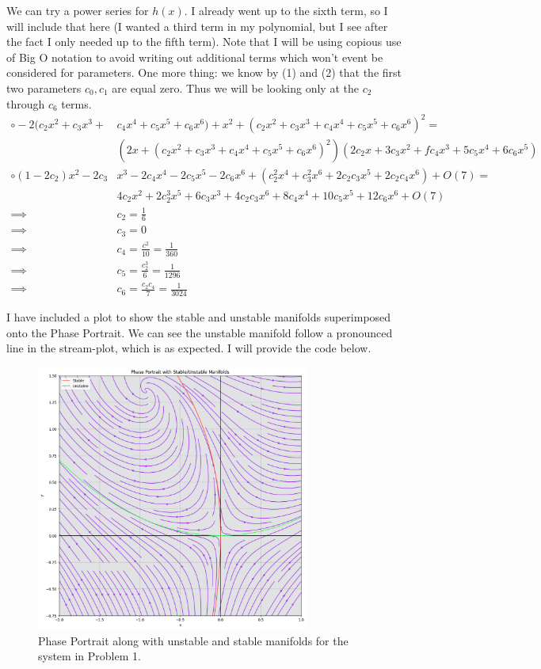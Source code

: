 \begin{solution}
    We can try a power series for $h(x)$. I already went up to the sixth term, so I will include that here (I wanted a third term in my polynomial, but I see after the fact I only needed up to the fifth term). Note that I will be using copious use of Big O notation to avoid writing out additional terms which won't event be considered for parameters. One more thing: we know by (1) and (2) that the first two parameters $c_0, c_1$ are equal zero. Thus we will be looking only at the $c_2$ through $c_6$ terms.
    \alignbreak
    \begin{align*}
        \circ-2(c_2x^2 + c_3x^3 + &c_4x^4 + c_5x^5 + c_6x^6) + x^2 + (c_2x^2 + c_3x^3 + c_4x^4 + c_5x^5 + c_6x^6)^2 =\\
        &(2x + (c_2x^2 + c_3x^3 + c_4x^4 + c_5x^5 + c_6x^6)^2)(2c_2x + 3c_3x^2 + fc_4x^3 + 5c_5x^4 + 6c_6x^5)\\
        \circ (1-2c_2)x^2 - 2c_3&x^3 - 2c_4x^4 - 2c_5x^5 - 2c_6x^6 + (c_2^2x^4 + c_3^2x^6 + 2c_2c_3x^5 + 2c_2c_4x^6) + O(7) =\\
        &4c_2x^2 + 2c_2^3x^5 + 6c_3x^3 + 4c_2c_3x^6 + 8c_4x^4 + 10c_5x^5 + 12c_6x^6 + O(7)\\
        \implies &c_2 = \frac{1}{6}\\
        \implies &c_3 = 0\\
        \implies &c_4 = \frac{c^2}{10} = \frac{1}{360}\\
        \implies &c_5 = \frac{c_2^3}{6} = \frac{1}{1296}\\
        \implies &c_6 = \frac{c_2c_4}{7} = \frac{1}{3024}
    \end{align*}
    \alignbreak
    
    I have included a plot to show the stable and unstable manifolds superimposed onto the Phase Portrait. We can see the unstable manifold follow a pronounced line in the stream-plot, which is as expected. I will provide the code below.

    \begin{figure}[ht]
        \centering
        \includegraphics[width = 0.8\textwidth]{Images/Phase Portrait.png}
        \caption{Phase Portrait along with unstable and stable manifolds for the system in Problem 1.}
        \label{fig:p1a streamplot}
    \end{figure}


\end{solution}
